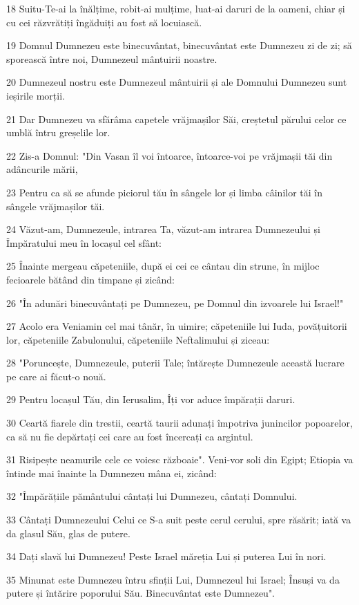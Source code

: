 \par 18 Suitu-Te-ai la înălțime, robit-ai mulțime, luat-ai daruri de la oameni, chiar și cu cei răzvrătiți îngăduiți au fost să locuiască.
\par 19 Domnul Dumnezeu este binecuvântat, binecuvântat este Dumnezeu zi de zi; să sporească între noi, Dumnezeul mântuirii noastre.
\par 20 Dumnezeul nostru este Dumnezeul mântuirii și ale Domnului Dumnezeu sunt ieșirile morții.
\par 21 Dar Dumnezeu va sfărâma capetele vrăjmașilor Săi, creștetul părului celor ce umblă întru greșelile lor.
\par 22 Zis-a Domnul: "Din Vasan îl voi întoarce, întoarce-voi pe vrăjmașii tăi din adâncurile mării,
\par 23 Pentru ca să se afunde piciorul tău în sângele lor și limba câinilor tăi în sângele vrăjmașilor tăi.
\par 24 Văzut-am, Dumnezeule, intrarea Ta, văzut-am intrarea Dumnezeului și Împăratului meu în locașul cel sfânt:
\par 25 Înainte mergeau căpeteniile, după ei cei ce cântau din strune, în mijloc fecioarele bătând din timpane și zicând:
\par 26 "În adunări binecuvântați pe Dumnezeu, pe Domnul din izvoarele lui Israel!"
\par 27 Acolo era Veniamin cel mai tânăr, în uimire; căpeteniile lui Iuda, povățuitorii lor, căpeteniile Zabulonului, căpeteniile Neftalimului și ziceau:
\par 28 "Poruncește, Dumnezeule, puterii Tale; întărește Dumnezeule această lucrare pe care ai făcut-o nouă.
\par 29 Pentru locașul Tău, din Ierusalim, Îți vor aduce împărații daruri.
\par 30 Ceartă fiarele din trestii, ceartă taurii adunați împotriva junincilor popoarelor, ca să nu fie depărtați cei care au fost încercați ca argintul.
\par 31 Risipește neamurile cele ce voiesc războaie". Veni-vor soli din Egipt; Etiopia va întinde mai înainte la Dumnezeu mâna ei, zicând:
\par 32 "Împărățiile pământului cântați lui Dumnezeu, cântați Domnului.
\par 33 Cântați Dumnezeului Celui ce S-a suit peste cerul cerului, spre răsărit; iată va da glasul Său, glas de putere.
\par 34 Dați slavă lui Dumnezeu! Peste Israel măreția Lui și puterea Lui în nori.
\par 35 Minunat este Dumnezeu întru sfinții Lui, Dumnezeul lui Israel; Însuși va da putere și întărire poporului Său. Binecuvântat este Dumnezeu".

